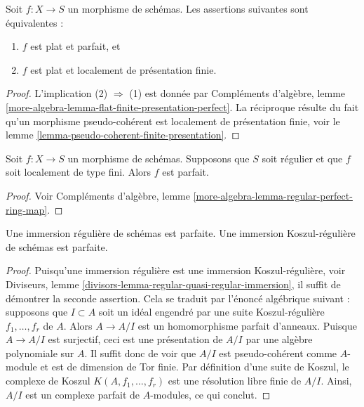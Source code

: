 \begin{lemma}
\label{lemma-flat-finite-presentation-perfect}
Soit $f : X \to S$ un morphisme de schémas.
Les assertions suivantes sont équivalentes :
\begin{enumerate}
\item $f$ est plat et parfait, et
\item $f$ est plat et localement de présentation finie.
\end{enumerate}
\end{lemma}

\begin{proof}
L'implication (2) $\Rightarrow$ (1) est donnée par
Compléments d'algèbre,
lemme \ref{more-algebra-lemma-flat-finite-presentation-perfect}.
La réciproque résulte du fait qu'un morphisme pseudo-cohérent
est localement de présentation finie, voir le
lemme \ref{lemma-pseudo-coherent-finite-presentation}.
\end{proof}

\begin{lemma}
\label{lemma-regular-target-perfect}
Soit $f : X \to S$ un morphisme de schémas.
Supposons que $S$ soit régulier et que $f$ soit localement de type fini.
Alors $f$ est parfait.
\end{lemma}

\begin{proof}
Voir
Compléments d'algèbre, lemme \ref{more-algebra-lemma-regular-perfect-ring-map}.
\end{proof}

\begin{lemma}
\label{lemma-regular-immersion-perfect}
Une immersion régulière de schémas est parfaite.
Une immersion Koszul-régulière de schémas est parfaite.
\end{lemma}

\begin{proof}
Puisqu'une immersion régulière est une immersion Koszul-régulière, voir
Diviseurs, lemme \ref{divisors-lemma-regular-quasi-regular-immersion},
il suffit de démontrer la seconde assertion. Cela se traduit par l'énoncé
algébrique suivant : supposons que $I \subset A$ soit un
idéal engendré par une suite Koszul-régulière $f_1, \ldots, f_r$ de $A$.
Alors $A \to A/I$ est un homomorphisme parfait d'anneaux. Puisque $A \to A/I$ est surjectif,
ceci est une présentation de $A/I$ par une algèbre polynomiale sur $A$.
Il suffit donc de voir que $A/I$ est pseudo-cohérent comme $A$-module
et est de dimension de Tor finie. Par définition d'une suite de Koszul,
le complexe de Koszul $K(A, f_1, \ldots, f_r)$ est une résolution libre finie
de $A/I$. Ainsi, $A/I$ est un complexe parfait de $A$-modules, ce qui conclut.
\end{proof}

